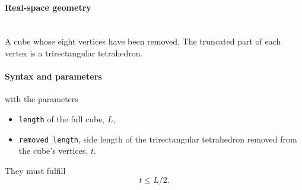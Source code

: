 \paragraph{Real-space geometry}\strut\\
A cube whose eight vertices have been removed. The truncated part of each vertex is a trirectangular tetrahedron.

\begin{figure}[h]
\hfill
{}
\hfill
{}
\hfill
{}
\hfill
\end{figure}

\FloatBarrier

\paragraph{Syntax and parameters}
\begin{quote}
\end{quote}
with the parameters
\begin{itemize}
\item \texttt{length} of the full cube, $L$,
\item \texttt{removed\_length}, side length of the trirectangular tetrahedron removed from the cube's vertices, $t$.
\end{itemize}
They must fulfill
\begin{displaymath}
  t \le L/2.
\end{displaymath}


